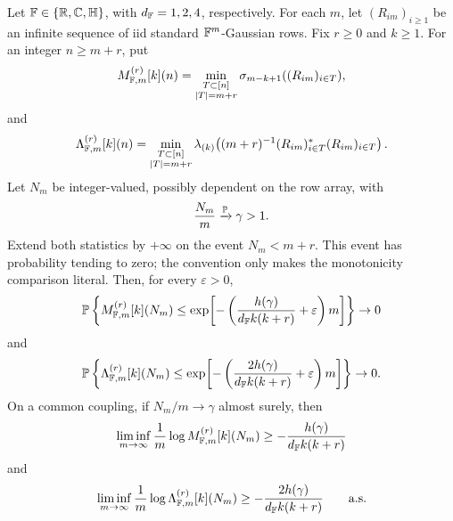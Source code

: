 \begin{corollary}\label{cor:random-prefix-fixed-excess-fixed-k-lower}
Let \(\mathbb{F}\in\{\mathbb{R},\mathbb{C},\mathbb{H}\}\), with \(d_{\mathbb{F}}=1,2,4\), respectively.  For each
\(m\), let \((R_{im})_{i\ge1}\) be an infinite sequence of iid standard
\(\mathbb{F}^m\)-Gaussian rows.  Fix \(r\ge0\) and \(k\ge1\).  For an integer
\(n\ge m+r\), put
\[
  M_{\mathbb{F},m}^{(r)}[k](n)
  =
  \min_{\substack{T\subset[n]\\ |T|=m+r}}
  \sigma_{m-k+1}((R_{im})_{i\in T}),
\]
and
\[
  \Lambda_{\mathbb{F},m}^{(r)}[k](n)
  =
  \min_{\substack{T\subset[n]\\ |T|=m+r}}
  \lambda_{(k)}\!\left((m+r)^{-1}(R_{im})_{i\in T}^*
  (R_{im})_{i\in T}\right).
\]
Let \(N_m\) be integer-valued, possibly dependent on the row array, with
\[
  \frac{N_m}{m}\xrightarrow{\mathbb{P}}\gamma>1 .
\]
Extend both statistics by \(+\infty\) on the event \(N_m<m+r\).  This event has
probability tending to zero; the convention only makes the monotonicity
comparison literal.
Then, for every \(\varepsilon>0\),
\[
  \mathbb{P}\left\{M_{\mathbb{F},m}^{(r)}[k](N_m)\le
  \exp\!\left[-\left(\frac{h(\gamma)}{d_{\mathbb{F}} k(k+r)}
  +\varepsilon\right)m\right]\right\}\to0
\]
and
\[
  \mathbb{P}\left\{\Lambda_{\mathbb{F},m}^{(r)}[k](N_m)\le
  \exp\!\left[-\left(\frac{2h(\gamma)}{d_{\mathbb{F}} k(k+r)}
  +\varepsilon\right)m\right]\right\}\to0.
\]
On a common coupling, if \(N_m/m\to\gamma\) almost surely, then
\[
  \liminf_{m\to\infty}\frac1m\log M_{\mathbb{F},m}^{(r)}[k](N_m)
  \ge -\frac{h(\gamma)}{d_{\mathbb{F}} k(k+r)}
\]
and
\[
  \liminf_{m\to\infty}\frac1m\log \Lambda_{\mathbb{F},m}^{(r)}[k](N_m)
  \ge -\frac{2h(\gamma)}{d_{\mathbb{F}} k(k+r)}
  \qquad\hbox{a.s.}
\]
\end{corollary}

